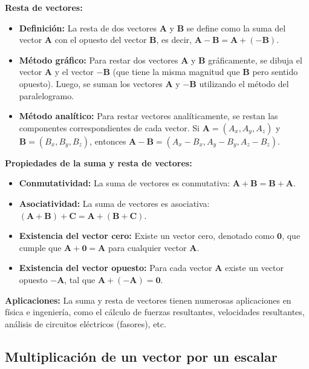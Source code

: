 \documentclass{article}
\begin{document}
\begin{minipage}{0.9\textwidth}
  \textbf{Resta de vectores:}
\begin{itemize}
\item \textbf{Definición:} La resta de dos vectores $\mathbf{A}$ y $\mathbf{B}$ se define como la suma del vector $\mathbf{A}$ con el opuesto del vector $\mathbf{B}$, es decir, $\mathbf{A} - \mathbf{B} = \mathbf{A} + (-\mathbf{B})$.
\item \textbf{Método gráfico:} Para restar dos vectores $\mathbf{A}$ y $\mathbf{B}$ gráficamente, se dibuja el vector $\mathbf{A}$ y el vector $-\mathbf{B}$ (que tiene la misma magnitud que $\mathbf{B}$ pero sentido opuesto). Luego, se suman los vectores $\mathbf{A}$ y $-\mathbf{B}$ utilizando el método del paralelogramo.
\item \textbf{Método analítico:} Para restar vectores analíticamente, se restan las componentes correspondientes de cada vector. Si $\mathbf{A} = (A_x, A_y, A_z)$ y $\mathbf{B} = (B_x, B_y, B_z)$, entonces $\mathbf{A} - \mathbf{B} = (A_x - B_x, A_y - B_y, A_z - B_z)$.
\end{itemize}
  
\end{minipage}

\textbf{Propiedades de la suma y resta de vectores:}

\begin{itemize}
\item \textbf{Conmutatividad:} La suma de vectores es conmutativa: $\mathbf{A} + \mathbf{B} = \mathbf{B} + \mathbf{A}$.
\item \textbf{Asociatividad:} La suma de vectores es asociativa: $(\mathbf{A} + \mathbf{B}) + \mathbf{C} = \mathbf{A} + (\mathbf{B} + \mathbf{C})$.
\item \textbf{Existencia del vector cero:} Existe un vector cero, denotado como $\mathbf{0}$, que cumple que $\mathbf{A} + \mathbf{0} = \mathbf{A}$ para cualquier vector $\mathbf{A}$.
\item \textbf{Existencia del vector opuesto:} Para cada vector $\mathbf{A}$ existe un vector opuesto $-\mathbf{A}$, tal que $\mathbf{A} + (-\mathbf{A}) = \mathbf{0}$.
\end{itemize}

\textbf{Aplicaciones:} La suma y resta de vectores tienen numerosas aplicaciones en física e ingeniería, como el cálculo de fuerzas resultantes, velocidades resultantes, análisis de circuitos eléctricos (fasores), etc.

\subsection{Multiplicación de un vector por un escalar}
\end{document}
